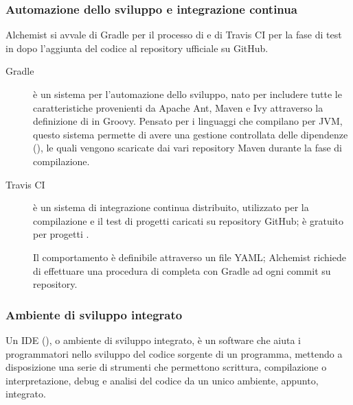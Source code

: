             \subsubsection{Automazione dello sviluppo e integrazione continua}\label{subsubsec:buildECI}
                Alchemist si avvale di Gradle per il processo di  e di Travis CI per la fase di test in  dopo l'aggiunta del codice al repository ufficiale su GitHub.

                \begin{description}
                    \item[Gradle\footnotemark]
                        è un sistema per l'automazione dello sviluppo, nato per includere tutte le caratteristiche provenienti da Apache Ant, Maven e Ivy attraverso la definizione di  in Groovy.
                        Pensato per i linguaggi che compilano per JVM, questo sistema permette di avere una gestione controllata delle dipendenze (), le quali vengono scaricate dai vari repository Maven durante la fase di compilazione.

                    \item[Travis CI\footnotemark]
                        è un sistema di integrazione continua distribuito, utilizzato per la compilazione e il test di progetti caricati su repository GitHub;
                        è gratuito per progetti .

                        Il comportamento è definibile attraverso un file YAML;
                        Alchemist richiede di effettuare una procedura di  completa con Gradle ad ogni commit su repository.
                \end{description}

            \subsubsection{Ambiente di sviluppo integrato}\label{subsubsec:IDE}
                Un IDE (), o ambiente di sviluppo integrato, è un software che aiuta i programmatori nello sviluppo del codice sorgente di un programma, mettendo a disposizione una serie di strumenti che permettono scrittura, compilazione o interpretazione, debug e analisi del codice da un unico ambiente, appunto, integrato.

